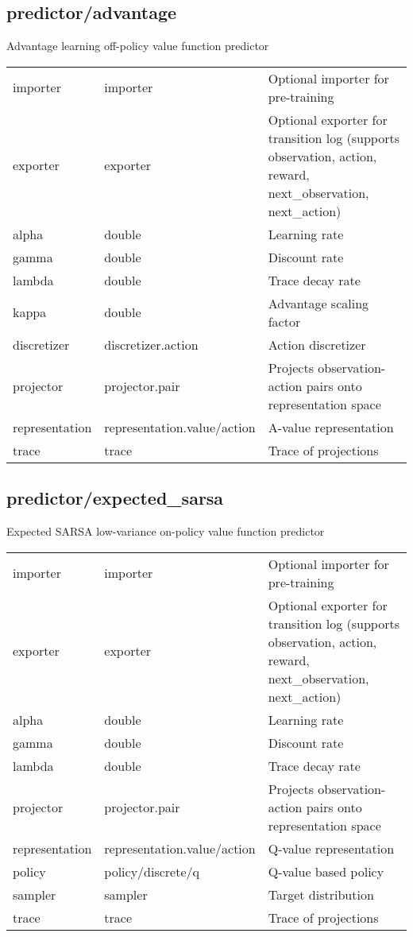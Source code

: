 \subsection{predictor/advantage}
\noindent Advantage learning off-policy value function predictor\\

\noindent\begin{tabular}{@{}lll@{}}
importer&importer&Optional importer for pre-training\\
exporter&exporter&Optional exporter for transition log (supports observation, action, reward, next\_observation, next\_action)\\
alpha&double&Learning rate\\
gamma&double&Discount rate\\
lambda&double&Trace decay rate\\
kappa&double&Advantage scaling factor\\
discretizer&discretizer.action&Action discretizer\\
projector&projector.pair&Projects observation-action pairs onto representation space\\
representation&representation.value/action&A-value representation\\
trace&trace&Trace of projections\\
\end{tabular}
\subsection{predictor/expected\_sarsa}
\noindent Expected SARSA low-variance on-policy value function predictor\\

\noindent\begin{tabular}{@{}lll@{}}
importer&importer&Optional importer for pre-training\\
exporter&exporter&Optional exporter for transition log (supports observation, action, reward, next\_observation, next\_action)\\
alpha&double&Learning rate\\
gamma&double&Discount rate\\
lambda&double&Trace decay rate\\
projector&projector.pair&Projects observation-action pairs onto representation space\\
representation&representation.value/action&Q-value representation\\
policy&policy/discrete/q&Q-value based policy\\
sampler&sampler&Target distribution\\
trace&trace&Trace of projections\\
\end{tabular}
